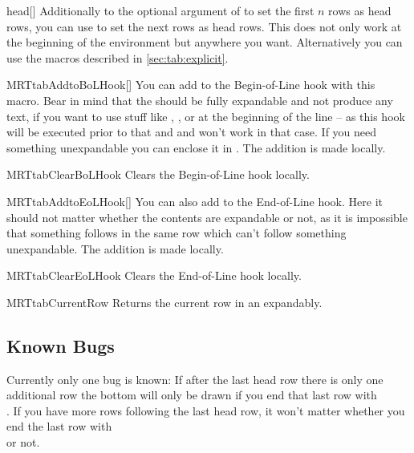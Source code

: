\begin{describemacro}{head}[]%
  Additionally to the optional argument of  to set the first $n$
  rows as head rows, you can use  to set the next  rows as
  head rows. This does not only work at the beginning of the environment but
  anywhere you want. Alternatively you can use the macros described in
  \autoref{sec:tab:explicit}.
\end{describemacro}%

\begin{describemacro}{MRTtabAddtoBoLHook}[]%
  You can add  to the Begin-of-Line hook with this macro. Bear in
  mind that the  should be fully expandable and not produce any
  text, if you want to use stuff like , , or
   at the beginning of the line -- as this hook will be executed prior
  to that and  and  won't work in that case. If you need
  something unexpandable you can enclose it in . The addition is
  made locally.
\end{describemacro}%

\begin{describemacro}{MRTtabClearBoLHook}%
  Clears the Begin-of-Line hook locally.
\end{describemacro}%

\begin{describemacro}{MRTtabAddtoEoLHook}[]%
  You can also add  to the End-of-Line hook. Here it should not
  matter whether the contents are expandable or not, as it is impossible that
  something follows in the same row which can't follow something unexpandable.
  The addition is made locally.
\end{describemacro}%

\begin{describemacro}{MRTtabClearEoLHook}%
  Clears the End-of-Line hook locally.
\end{describemacro}%

\begin{describemacro}{MRTtabCurrentRow}%
  Returns the current row in an  expandably.
\end{describemacro}%

\subsection{Known Bugs}
Currently only one bug is known: If after the last head row there is only one
additional row the bottom  will only be drawn if you end that last row
with \texttt{\string\\}. If you have more rows following the last head row,
it won't matter whether you end the last row with \texttt{\string\\} or not.

